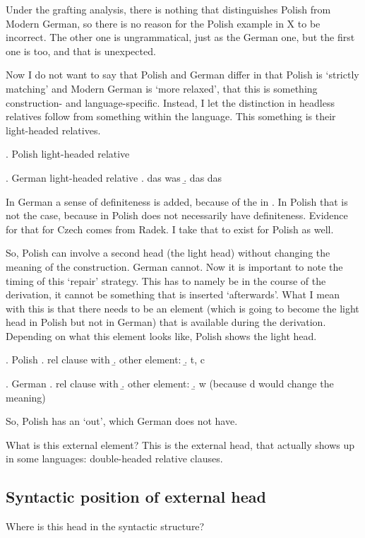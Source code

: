 Under the grafting analysis, there is nothing that distinguishes Polish from Modern German, so there is no reason for the Polish example in X to be incorrect. The other one is ungrammatical, just as the German one, but the first one is too, and that is unexpected.

Now I do not want to say that Polish and German differ in that Polish is `strictly matching' and Modern German is `more relaxed', that this is something construction- and language-specific. Instead, I let the distinction in headless relatives follow from something within the language. This something is their light-headed relatives.

\ex. Polish light-headed relative

\ex. German light-headed relative
\a. das was
\b. das das

In German a sense of definiteness is added, because of the  in . In Polish that is not the case, because  in Polish does not necessarily have definiteness. Evidence for that for Czech comes from Radek. I take that to exist for Polish as well.

So, Polish can involve a second head (the light head) without changing the meaning of the construction. German cannot. Now it is important to note the timing of this `repair' strategy. This has to namely be in the course of the derivation, it cannot be something that is inserted `afterwards'. What I mean with this is that there needs to be an element (which is going to become the light head in Polish but not in German) that is available during the derivation. Depending on what this element looks like, Polish shows the light head.

\ex. Polish
\a. rel clause with 
\b. other element: 
\b. t, c

\ex. German
\a. rel clause with 
\b. other element: 
\b. w (because d would change the meaning)

So, Polish has an `out', which German does not have.

What is this external element? This is the external head, that actually shows up in some languages: double-headed relative clauses.



\subsection{Syntactic position of external head}

Where is this head in the syntactic structure?

